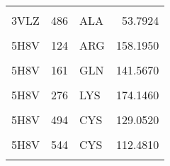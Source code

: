 \begin{table}
\begin{tabular}{lrlr}
			\cellcolor{gray!6}{3VLZ} & \cellcolor{gray!6}{485} & \cellcolor{gray!6}{CYS} & \cellcolor{gray!6}{115.6310}\\
			3VLZ & 486 & ALA & 53.7924\\
			\cellcolor{gray!6}{5H8V} & \cellcolor{gray!6}{106} & \cellcolor{gray!6}{TYR} & \cellcolor{gray!6}{153.7720}\\
			5H8V & 124 & ARG & 158.1950\\
			\addlinespace
			\cellcolor{gray!6}{5H8V} & \cellcolor{gray!6}{156} & \cellcolor{gray!6}{THR} & \cellcolor{gray!6}{114.0040}\\
			5H8V & 161 & GLN & 141.5670\\
			\cellcolor{gray!6}{5H8V} & \cellcolor{gray!6}{193} & \cellcolor{gray!6}{ARG} & \cellcolor{gray!6}{152.0550}\\
			5H8V & 276 & LYS & 174.1460\\
			\cellcolor{gray!6}{5H8V} & \cellcolor{gray!6}{278} & \cellcolor{gray!6}{LYS} & \cellcolor{gray!6}{140.5820}\\
			\addlinespace
			5H8V & 494 & CYS & 129.0520\\
			\cellcolor{gray!6}{5H8V} & \cellcolor{gray!6}{542} & \cellcolor{gray!6}{ASN} & \cellcolor{gray!6}{120.9920}\\
			5H8V & 544 & CYS & 112.4810\\
			\cellcolor{gray!6}{5H8V} & \cellcolor{gray!6}{545} & \cellcolor{gray!6}{ALA} & \cellcolor{gray!6}{49.2614}\\
			\bottomrule
		\end{tabular}
	\end{table}
